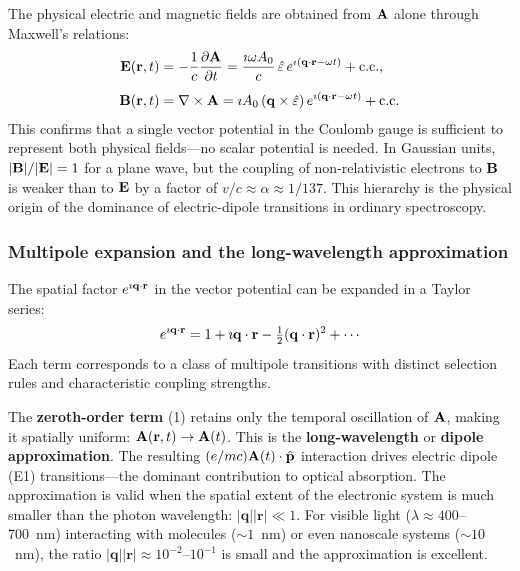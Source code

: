The physical electric and magnetic fields are obtained from $\mathbf{A}$
alone through Maxwell's relations:
\begin{align}
  \mathbf{E}(\mathbf{r},t)
  &= -\frac{1}{c}\frac{\partial\mathbf{A}}{\partial t}
   = \frac{\imath\omega A_0}{c}\,\hat{\varepsilon}\,
     e^{\imath(\mathbf{q}\cdot\mathbf{r}-\omega t)}
     + \text{c.c.},
  \label{eq:E-from-A}
  \\[4pt]
  \mathbf{B}(\mathbf{r},t)
  &= \nabla\times\mathbf{A}
   = \imath A_0\,(\mathbf{q}\times\hat{\varepsilon})\,
     e^{\imath(\mathbf{q}\cdot\mathbf{r}-\omega t)}
     + \text{c.c.}
  \label{eq:B-from-A}
\end{align}
This confirms that a single vector potential in the Coulomb gauge is
sufficient to represent both physical fields---no scalar potential
is needed.  In Gaussian units,
$|\mathbf{B}|/|\mathbf{E}| = 1$ for a plane wave, but the coupling of
non-relativistic electrons to $\mathbf{B}$ is weaker than to $\mathbf{E}$ by
a factor of $v/c \approx \alpha \approx 1/137$.  This hierarchy is
the physical origin of the dominance of electric-dipole transitions
in ordinary spectroscopy.


\subsubsection{Multipole expansion and the long-wavelength
               approximation}
\label{sec:multipole}

The spatial factor $e^{\imath\mathbf{q}\cdot\mathbf{r}}$ in the
vector potential can be expanded in a Taylor series:
\begin{equation}
  e^{\iunit\mathbf{q}\cdot\mathbf{r}}
  = 1 + \iunit\mathbf{q}\cdot\mathbf{r}
  - \tfrac{1}{2}(\mathbf{q}\cdot\mathbf{r})^2
  + \cdots
  \label{eq:multipole}
\end{equation}
Each term corresponds to a class of multipole transitions with
distinct selection rules and characteristic coupling strengths.

The \textbf{zeroth-order term} (1) retains only the temporal
oscillation of $\mathbf{A}$, making it spatially uniform:
$\mathbf{A}(\mathbf{r},t) \to \mathbf{A}(t)$.  This is the
\textbf{long-wavelength} or \textbf{dipole approximation}.
The resulting $(e/mc)\mathbf{A}(t)\cdot\hat{\mathbf{p}}$ interaction drives
electric dipole (E1) transitions---the dominant contribution to
optical absorption.  The approximation is valid when the spatial
extent of the electronic system is much smaller than the photon
wavelength: $|\mathbf{q}||\mathbf{r}| \ll 1$.
For visible light ($\lambda \approx 400$--700~nm) interacting with
molecules (${\sim}1$~nm) or even nanoscale systems (${\sim}10$~nm),
the ratio $|\mathbf{q}||\mathbf{r}| \approx 10^{-2}$--$10^{-1}$ is
small and the approximation is excellent.

